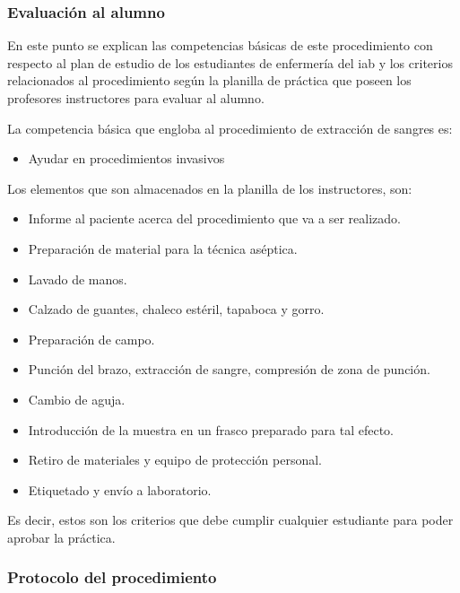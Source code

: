 \subsubsection{Evaluación al alumno}

En este punto se explican las competencias básicas de este procedimiento con
respecto al plan de estudio de los estudiantes de enfermería del \Gls{iab} y los
criterios relacionados al procedimiento según la planilla de práctica que poseen 
los profesores instructores para evaluar al alumno.

La competencia básica que engloba al procedimiento de extracción de sangres es:

\begin{itemize}
\item Ayudar en procedimientos invasivos
\end{itemize}

Los elementos que son almacenados en la planilla de los instructores, son:

\begin{itemize}
\item Informe al paciente acerca del procedimiento que va a ser
    realizado.
\item Preparación de material para la técnica aséptica.
\item Lavado de manos.
\item Calzado de guantes, chaleco estéril, tapaboca y gorro.
\item Preparación de campo.
\item Punción del brazo, extracción de sangre, compresión de zona de punción.
\item Cambio de aguja.
\item Introducción de la muestra en un frasco preparado para tal efecto.
\item Retiro de materiales y equipo de protección personal.
\item Etiquetado y envío a laboratorio.
\end{itemize}

Es decir, estos son los criterios que debe cumplir cualquier estudiante
para poder aprobar la práctica.

\subsubsection{Protocolo del procedimiento}
\label{sec:hemocultivo_protocolo}

